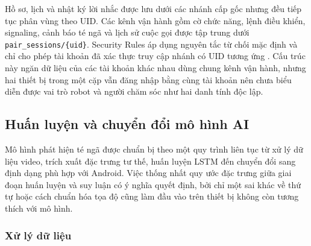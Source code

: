 Hồ sơ, lịch và nhật ký lời nhắc được lưu dưới các nhánh cấp gốc nhưng đều tiếp tục phân vùng theo UID. Các kênh vận hành gồm cờ chức năng, lệnh điều khiển, signaling, cảnh báo té ngã và lịch sử cuộc gọi được tập trung dưới \texttt{pair\_sessions/\{uid\}}. Security Rules áp dụng nguyên tắc từ chối mặc định và chỉ cho phép tài khoản đã xác thực truy cập nhánh có UID tương ứng . Cấu trúc này ngăn dữ liệu của các tài khoản khác nhau dùng chung kênh vận hành, nhưng hai thiết bị trong một cặp vẫn đăng nhập bằng cùng tài khoản nên chưa biểu diễn được vai trò robot và người chăm sóc như hai danh tính độc lập.

\subsection{Huấn luyện và chuyển đổi mô hình AI}

Mô hình phát hiện té ngã được chuẩn bị theo một quy trình liên tục từ xử lý dữ liệu video, trích xuất đặc trưng tư thế, huấn luyện LSTM đến chuyển đổi sang định dạng phù hợp với Android. Việc thống nhất quy ước đặc trưng giữa giai đoạn huấn luyện và suy luận có ý nghĩa quyết định, bởi chỉ một sai khác về thứ tự hoặc cách chuẩn hóa tọa độ cũng làm đầu vào trên thiết bị không còn tương thích với mô hình.

\subsubsection{Xử lý dữ liệu}

